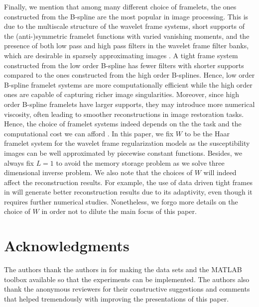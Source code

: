 \documentclass[reqno]{siamonline1116}
\numberwithin{theorem}{section}
\numberwithin{equation}{section}
\begin{document}
Finally, we mention that among many different choice of framelets, the ones constructed from the B-spline are the most popular in image processing. This is due to the multiscale structure of the wavelet frame systems, short supports of the (anti-)symmetric framelet functions with varied vanishing moments, and the presence of both low pass and high pass filters in the wavelet frame filter banks, which are desirable in sparsely approximating images \cite{B.Dong2017a}. A tight frame system constructed from the low order B-spline has fewer filters with shorter supports compared to the ones constructed from the high order B-splines. Hence, low order B-spline framelet systems are more computationally efficient while the high order ones are capable of capturing richer image singularities. Moreover, since high order B-spline framelets have larger supports, they may introduce more numerical viscosity, often leading to smoother reconstructions in image restoration tasks. Hence, the choice of framelet systems indeed depends on the the task and the computational cost we can afford \cite{H.Zhang2018}. In this paper, we fix $W$ to be the Haar framelet system for the wavelet frame regularization models as the susceptibility images can be well approximated by piecewise constant functions. Besides, we always fix $L=1$ to avoid the memory storage problem as we solve three dimensional inverse problem. We also note that the choices of $W$ will indeed affect the reconstruction results. For example, the use of data driven tight frames in \cite{J.F.Cai2014} will generate better reconstruction results due to its adaptivity, even though it requires further numerical studies. Nonetheless, we forgo more details on the choice of $W$ in order not to dilute the main focus of this paper.

\section*{Acknowledgments} The authors thank the authors in \cite{Y.Wang2015,C.Wisnieff2013} for making the data sets and the MATLAB toolbox available so that the experiments can be implemented. The authors also thank the anonymous reviewers for their constructive suggestions and comments that helped tremendously with improving the presentations of this paper.
\end{document}
